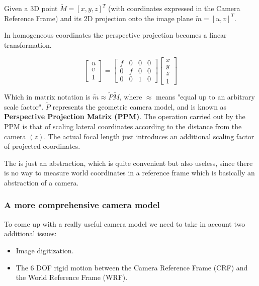 \documentclass{article}
\begin{document}
Given a 3D point $\tilde{M} = [x,y,z]^T$ (with coordinates expressed in the Camera Reference Frame) and its 2D projection onto the image plane $\tilde{m} = [u,v]^T$.

In homogeneous coordinates the perspective projection becomes a linear transformation.

$$
\begin{bmatrix}
u \\ v \\ 1
\end{bmatrix} =
\begin{bmatrix}
f & 0 & 0 & 0 \\
0 & f & 0 & 0 \\
0 & 0 & 1 & 0 
\end{bmatrix}
\begin{bmatrix}
x \\ y \\ z \\ 1
\end{bmatrix}
$$

Which in matrix notation is $\tilde{m} \approx \tilde{P}\tilde{M}$, where $\approx$ means "equal up to an arbitrary scale factor".
\vspace{1em}
$\tilde{P}$ represents the geometric camera model, and is known as \textbf{Perspective Projection Matrix (PPM)}.
\vspace{1em}
The operation carried out by the PPM is that of scaling lateral coordinates according to the distance from the camera $(z)$.
The actual focal length just introduces an additional scaling factor of projected coordinates.

The is just an abstraction, which is quite convenient but also useless, since there is no way to measure world coordinates in a reference frame which is basically an abstraction of a camera.

\subsubsection{A more comprehensive camera model}

To come up with a really useful camera model we need to take in account two additional issues:
\begin{itemize}
  \item Image digitization.
  \item The 6 DOF rigid motion between the Camera Reference Frame (CRF) and the World Reference Frame (WRF).
\end{itemize}
\end{document}
